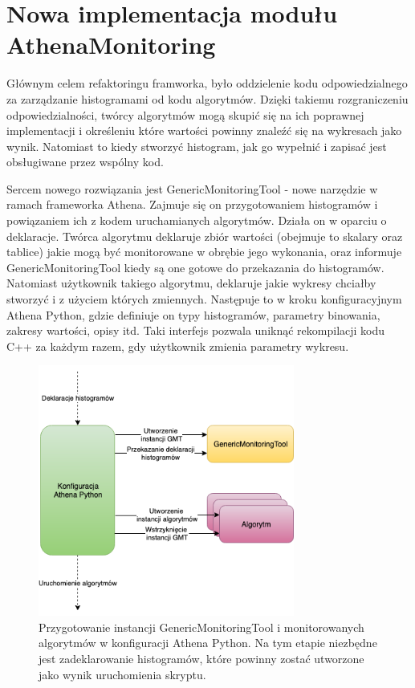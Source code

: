\section{Nowa implementacja modułu AthenaMonitoring}
Głównym celem refaktoringu framworka, było oddzielenie kodu odpowiedzialnego za zarządzanie histogramami od kodu algorytmów. 
Dzięki takiemu rozgraniczeniu odpowiedzialności, twórcy algorytmów mogą skupić się na ich poprawnej implementacji i określeniu które wartości powinny znaleźć się na wykresach jako wynik. 
Natomiast to kiedy stworzyć histogram, jak go wypełnić i zapisać jest obsługiwane przez wspólny kod. 

Sercem nowego rozwiązania jest GenericMonitoringTool - nowe narzędzie w ramach frameworka Athena.
Zajmuje się on przygotowaniem histogramów i powiązaniem ich z kodem uruchamianych algorytmów. 
Działa on w oparciu o deklaracje.
Twórca algorytmu deklaruje zbiór wartości (obejmuje to skalary oraz tablice) jakie mogą być monitorowane w obrębie jego wykonania, oraz informuje GenericMonitoringTool kiedy są one gotowe do przekazania do histogramów.
Natomiast użytkownik takiego algorytmu, deklaruje jakie wykresy chciałby stworzyć i z użyciem których zmiennych. 
Następuje to w kroku konfiguracyjnym Athena Python, gdzie definiuje on typy histogramów, parametry binowania, zakresy wartości, opisy itd. 
Taki interfejs pozwala uniknąć rekompilacji kodu C++ za każdym razem, gdy użytkownik zmienia parametry wykresu. 

\begin{figure}[!ht]
\centering
\includegraphics[width=0.75\textwidth]{img/algo_init.png}
\caption{
Przygotowanie instancji GenericMonitoringTool i monitorowanych algorytmów w konfiguracji Athena Python. Na tym etapie niezbędne jest zadeklarowanie histogramów, które powinny zostać utworzone jako wynik uruchomienia skryptu.
}
\label{fig:athena:oldFlow}
\end{figure}


